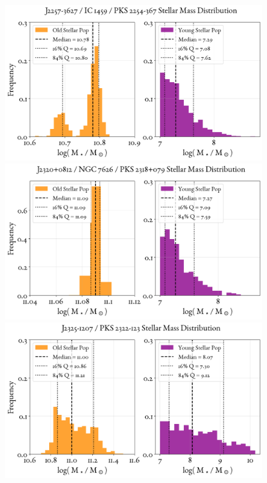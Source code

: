 \begin{figure}
    \centering
    \includegraphics[width=0.8\linewidth]{figures/ResultMasses/82_MassDistri_5061.png}\\
    \includegraphics[width=0.8\linewidth]{figures/ResultMasses/83_MassDistri_5120.png}\\
    \includegraphics[width=0.8\linewidth]{figures/ResultMasses/85_MassDistri_5132.png}    
\end{figure}
